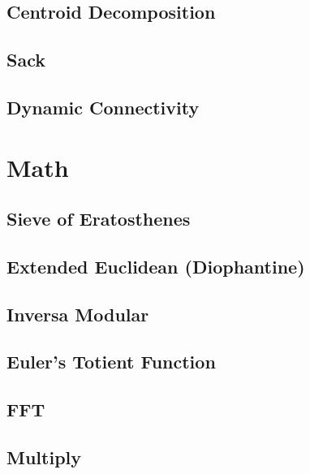 \subsection{Centroid Decomposition}
\raggedbottom
\hrulefill
\subsection{Sack}
\raggedbottom
\hrulefill
\subsection{Dynamic Connectivity}
\raggedbottom
\hrulefill

\section{Math}
\subsection{Sieve of Eratosthenes}
\raggedbottom
\hrulefill
\subsection{Extended Euclidean (Diophantine)}
\raggedbottom
\hrulefill
\subsection{Inversa Modular}
\raggedbottom
\hrulefill
\subsection{Euler’s Totient Function}
\raggedbottom
\hrulefill
\subsection{FFT}
\raggedbottom
\hrulefill
\subsection{Multiply}
\raggedbottom
\hrulefill
